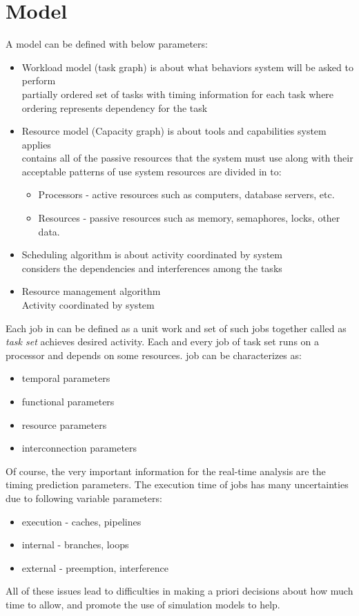 \section{\rtsS Model}\label{section:rts-model}
A \rtsS model can be defined with below parameters:
\begin{itemize}
    \item Workload model (task graph) is about what behaviors system will be asked to perform
        \\ partially ordered set of tasks with timing information for each task where ordering represents dependency for the task
    \item Resource model (Capacity graph) is about tools and capabilities system applies
        \\ contains all of the passive resources that the system must use along with their acceptable patterns of use
    system resources are divided in to:
    \begin{itemize}
        \item Processors - active resources such as computers, database servers, etc.
        \item Resources - passive resources such as memory, semaphores, locks, other data.
    \end{itemize}
    \item Scheduling algorithm is about activity coordinated by system
        \\ considers the dependencies and interferences among the tasks
    \item Resource management algorithm
    \\ Activity coordinated by system
\end{itemize}

Each job in \rtsS can be defined as a unit work and set of such jobs together called as \textit{task set} achieves desired activity. Each and every job of task set runs on a processor and depends on some resources.
\rtsS job can be characterizes as:
\begin{itemize}
    \item temporal parameters
    \item functional parameters
    \item resource parameters
    \item interconnection parameters
\end{itemize}
Of course, the very important information for the real-time analysis are the timing prediction parameters. The execution time of jobs has many uncertainties due to following variable parameters:
\begin{itemize}
    \item execution - caches, pipelines
    \item internal - branches, loops
    \item external - preemption, interference
\end{itemize}
All of these issues lead to difficulties in making a priori decisions about how much time to allow, and promote the use of simulation models to help.

